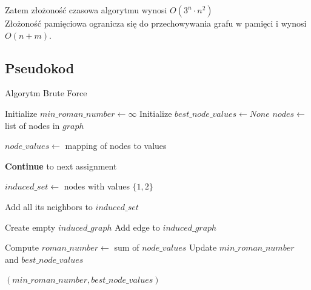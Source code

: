 Zatem złożoność czasowa algorytmu wynosi $O(3^n \cdot n^2)$\\
Złożoność pamięciowa ogranicza się do przechowywania grafu w pamięci i wynosi $O(n + m)$.

\subsection{Pseudokod}

\begin{algorithm}[H]
    \caption*{Algorytm Brute Force}
    \begin{algorithmic}[1]
            \State Initialize $min\_roman\_number \gets \infty$
            \State Initialize $best\_node\_values \gets None$
            \State $nodes \gets$ list of nodes in $graph$
    
                \State $node\_values \gets$ mapping of nodes to values
                
                 
                            \State \textbf{Continue} to next assignment
                        \EndIf
                    \EndIf
                \EndFor
                
                \State $induced\_set \gets$ nodes with values $\{1,2\}$
    
                    \State Add all its neighbors to $induced\_set$
                \EndFor
    
                \State Create empty $induced\_graph$
                                \State Add edge to $induced\_graph$
                            \EndIf
                        \EndFor
                    \EndIf
                \EndFor
    
                    \State Compute $roman\_number \gets$ sum of $node\_values$
                        \State Update $min\_roman\_number$ and $best\_node\_values$
                    \EndIf
                \EndIf
            \EndFor
    
            \State \Return $(min\_roman\_number, best\_node\_values)$
        \EndFunction
    \end{algorithmic}
\end{algorithm}

